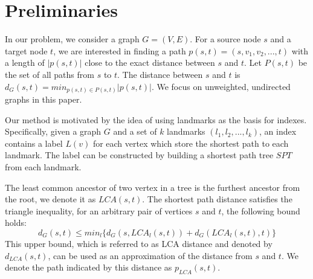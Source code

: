 \section{Preliminaries}
\label{preliminary}

In our problem, we consider a graph $G = (V,E)$. For a source node $s$ and a target node $t$, we are interested in finding a path $p(s,t)=(s,v_1,v_2,...,t)$ with a length of $|p(s,t)|$ close to the exact distance between $s$ and $t$. Let $P(s,t)$ be the set of all paths from $s$ to $t$. The distance between $s$ and $t$ is $d_G(s,t) = min_{p(s,t) \in P(s,t)}|p(s,t)|$. We focus on unweighted, undirected graphs in this paper.


Our method is motivated by the idea of using landmarks as the basis for indexes. Specifically, given a graph $G$ and a set of $k$ landmarks $(l_1,l_2,...,l_k)$, an index contains a label $L(v)$ for each vertex which store the shortest path to each landmark. The label can be constructed by building a shortest path tree $SPT$ from each landmark.


The least common ancestor of two vertex in a tree is the furthest ancestor from the root, we denote it as $LCA(s,t)$. The shortest path distance satisfies the triangle inequality, for an arbitrary pair of vertices $s$ and $t$, the following bound holds:
\begin{equation}
\label{equ:upper}
    d_G(s,t) \leq min_{l}\{d_G(s,LCA_{l}(s,t)) + d_G(LCA_{l}(s,t),t)\}
\end{equation}
This upper bound, which is referred to as LCA distance and denoted by $d_{LCA}(s,t)$, can be used as an approximation of the distance from $s$ and $t$. We denote the path indicated by this distance as $p_{LCA}(s,t)$.